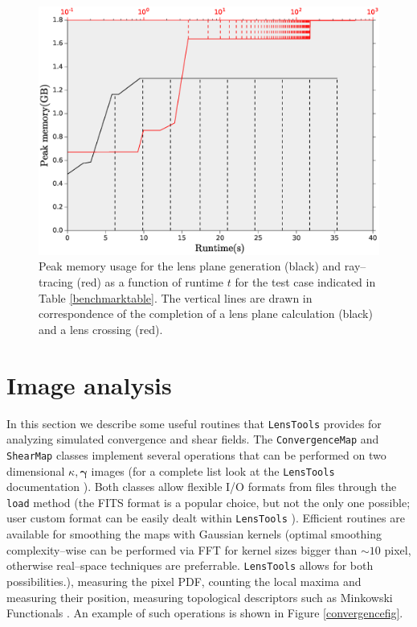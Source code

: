 \documentclass[5p]{elsarticle}
\newcommand{\ttt}[1]{\texttt{#1}}
\newcommand{\LT}{\texttt{LensTools} }
\begin{document}
\begin{figure}
\begin{center}
\includegraphics[scale=0.3]{Figures/memory_usage.eps}
\caption{Peak memory usage for the lens plane generation (black) and ray--tracing (red) as a function of runtime $t$ for the test case indicated in Table \ref{benchmarktable}. The vertical lines are drawn in correspondence of the completion of a lens plane calculation (black) and a lens crossing (red).}
\label{memoryfig}
\end{center}
\end{figure}


\section{Image analysis}
%
In this section we describe some useful routines that \LT provides for analyzing simulated convergence and shear fields. The \ttt{ConvergenceMap} and \ttt{ShearMap} classes implement several operations that can be performed on two dimensional $\kappa,\pmb{\gamma}$ images (for a complete list look at the \LT documentation \citep{lenstoolsdocs}). Both classes allow flexible I/O formats from files through the \ttt{load} method (the FITS format \citep{cfitsio} is a popular choice, but not the only one possible; user custom format can be easily dealt within \LT). Efficient routines are available for smoothing the maps with Gaussian kernels (optimal smoothing complexity--wise can be performed via FFT for kernel sizes bigger than $\sim 10$ pixel, otherwise real--space techniques are preferrable. \LT allows for both possibilities.), measuring the pixel PDF, counting the local maxima and measuring their position, measuring topological descriptors such as Minkowski Functionals \citep{MatsubaraMink}. An example of such operations is shown in Figure \ref{convergencefig}.  
\end{document}

